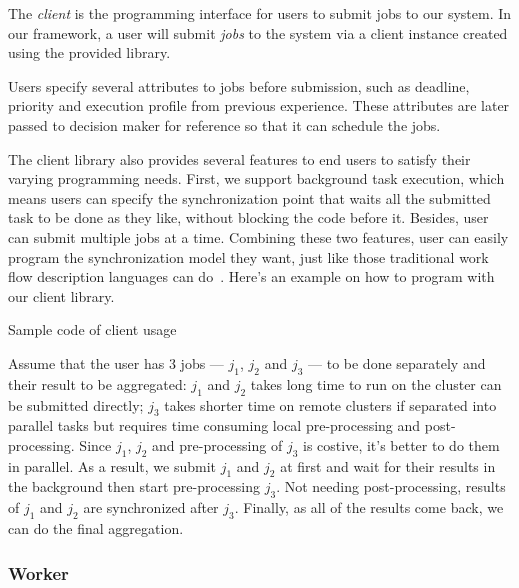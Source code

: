 The \emph{client} is the programming interface for users to submit jobs
to our system.
In our framework, a user will submit \emph{jobs} to the system via a
client instance created using the provided library.

Users specify several attributes to jobs before submission, such as
deadline, priority and execution profile from previous experience.
These attributes are later passed to decision maker for reference so
that it can schedule the jobs.

The client library also provides several features to end users to
satisfy their varying programming needs.
First, we support background task execution, which means users can
specify the synchronization point that waits all the submitted task to
be done as they like, without blocking the code before it.
Besides, user can submit multiple jobs at a time.
Combining these two features, user can easily program the
synchronization model they want, just like those traditional work flow
description languages can do~\cite{cite:workflow-management}.
Here's an example on how to program with our client library.

\begin{Example Code}
  
  \caption{Sample code of client usage}
\end{Example Code}

Assume that the user has 3 jobs --- $j_1$, $j_2$ and $j_3$ --- to be
done separately and their result to be aggregated:  $j_1$ and $j_2$
takes long time to run on the cluster can be submitted directly; $j_3$
takes shorter time on remote clusters if separated into parallel tasks
but requires time consuming local pre-processing and post-processing.
Since $j_1$, $j_2$ and pre-processing of $j_3$ is costive, it's better
to do them in parallel.
As a result, we submit $j_1$ and $j_2$ at first and wait for their
results in the background then start pre-processing $j_3$. Not needing
post-processing, results of $j_1$ and $j_2$ are synchronized after
$j_3$.
Finally, as all of the results come back, we can do the final
aggregation.


\subsubsection{Worker}	%

